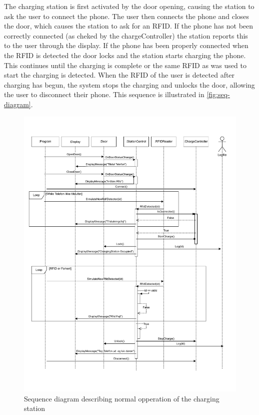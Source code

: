 The charging station is first activated by the door opening, causing the station to ask the user to connect the phone. The user then connects the phone and closes the door, which causes the station to ask for an RFID. If the phone has not been correctly connected (as cheked by the chargeController) the station reports this to the user through the display. If the phone has been properly connected when the RFID is detected the door locks and the station starts charging the phone. This continues until the charging is complete or the same RFID as was used to start the charging is detected. When the RFID of the user is detected after charging has begun, the system stops the charging and unlocks the door, allowing the user to disconnect their phone.
This sequence is illustrated in \autoref{fig:seq-diagram}.

\newpage

\begin{figure}[h]
  \centering
  \includegraphics[scale = .6, trim={0cm 2cm 0cm 0cm}]{02-Body/images/SEQpdf.pdf}
  \caption{Sequence diagram describing normal opperation of the charging station}
  \label{fig:seq-diagram}
\end{figure}

